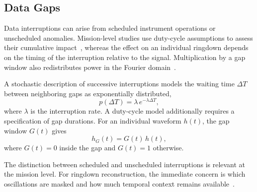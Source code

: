 \documentclass[prd,aps,a4paper,twocolumn,superscriptaddress,nofootinbib,floatfix]{revtex4-2}
\begin{document}
\subsection{Data Gaps}
\label{subsec:data_gaps_condensed}
Data interruptions can arise from scheduled instrument operations or unscheduled anomalies. Mission-level studies use duty-cycle assumptions to assess their cumulative impact~\cite{AmaroSeoane:2021}, whereas the effect on an individual ringdown depends on the timing of the interruption relative to the signal. Multiplication by a gap window also redistributes power in the Fourier domain~\cite{Harris:1978}.

A stochastic description of successive interruptions models the waiting time $\Delta T$ between neighboring gaps as exponentially distributed,
\begin{equation}
p(\Delta T)=\lambda\,e^{-\lambda \Delta T},
\end{equation}
where $\lambda$ is the interruption rate. A duty-cycle model additionally requires a specification of gap durations. For an individual waveform $h(t)$, the gap window $G(t)$ gives
\begin{equation}
h_G(t)=G(t)\,h(t),
\end{equation}
where $G(t)=0$ inside the gap and $G(t)=1$ otherwise.

The distinction between scheduled and unscheduled interruptions is relevant at the mission level. For ringdown reconstruction, the immediate concern is which oscillations are masked and how much temporal context remains available~\cite{shi2024effectsdatagapsringdown}. 
\end{document}
